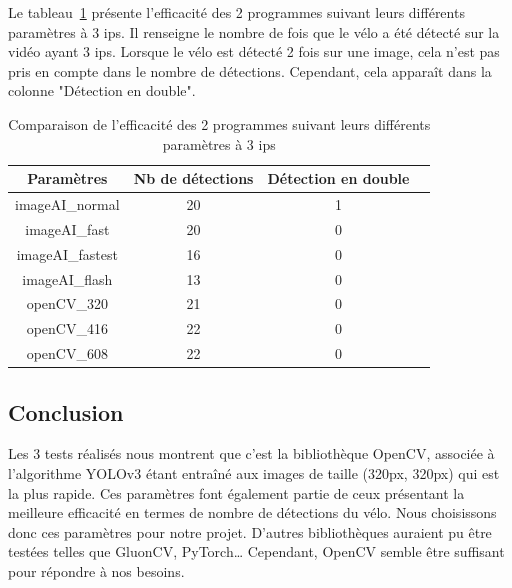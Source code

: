 Le tableau~\ref{tab_3fps} présente l'efficacité des 2 programmes suivant leurs différents paramètres à 3 ips.
Il renseigne le nombre de fois que le vélo a été détecté sur la vidéo ayant 3 ips.
Lorsque le vélo est détecté 2 fois sur une image, cela n'est pas pris en compte dans le nombre de détections.
Cependant, cela apparaît dans la colonne "Détection en double".

\begin{table}[H]
    \centering
    \begin{tabular}{|c|c|c|c|}
        \hline
        \rowcolor{tableColorDark} Paramètres & Nb de détections & Détection en double \\
        \hline

        imageAI\_normal                      & 20               & 1                   \\\hline
        imageAI\_fast                        & 20               & 0                   \\\hline
        imageAI\_fastest                     & 16               & 0                   \\\hline
        imageAI\_flash                       & 13               & 0                   \\\hline
        openCV\_320                          & 21               & 0                   \\\hline
        openCV\_416                          & 22               & 0                   \\\hline
        openCV\_608                          & 22               & 0                   \\\hline
    \end{tabular}
    \caption{Comparaison de l'efficacité des 2 programmes suivant leurs différents paramètres à 3 ips}
    \label{tab_3fps}
\end{table}

\subsection{Conclusion}
\label{sec:comparaisonIA:conclusion}

Les 3 tests réalisés nous montrent que c'est la bibliothèque OpenCV,
associée à l'algorithme YOLOv3 étant entraîné aux images de taille (320px, 320px) qui est la plus rapide.
Ces paramètres font également partie de ceux présentant la meilleure efficacité en termes de nombre de détections du vélo.
Nous choisissons donc ces paramètres pour notre projet.
D'autres bibliothèques auraient pu être testées telles que GluonCV, PyTorch\dots
Cependant, OpenCV semble être suffisant pour répondre à nos besoins.

